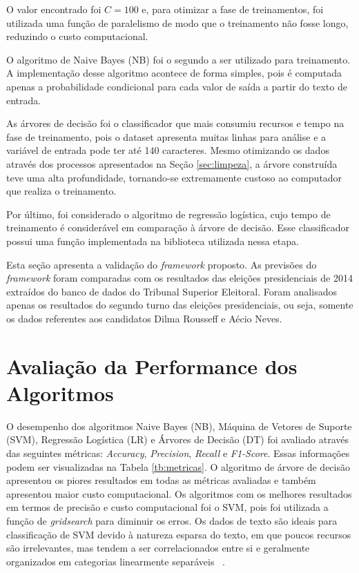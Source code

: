 O valor encontrado foi $C = 100$ e, para otimizar a fase de treinamentos, foi utilizada uma função de paralelismo de modo que o treinamento não fosse longo, reduzindo o custo computacional.

O algoritmo de Naive Bayes (NB) foi o segundo a ser utilizado para treinamento. A implementação desse algoritmo acontece de forma simples, pois é 
computada apenas a probabilidade condicional para cada valor de saída a partir do texto de entrada.


 As árvores de decisão foi o classificador que mais consumiu recursos e tempo na fase de treinamento, pois o dataset apresenta muitas linhas para análise
 e a variável de entrada pode ter até 140 caracteres. Mesmo otimizando os dados através dos processos apresentados na Seção \ref{sec:limpeza}, 
 a árvore construída teve uma alta profundidade, tornando-se extremamente custoso ao computador que realiza o treinamento.
 
Por último, foi considerado o algoritmo de regressão logística, cujo tempo de treinamento é considerável em comparação à árvore de decisão. Esse classificador possui uma função implementada na biblioteca utilizada nessa etapa.

Esta seção apresenta a validação do \textit{framework} proposto. As previsões do \textit{framework} foram comparadas com os 
resultados das eleições presidenciais de 2014 extraídos do banco
de dados do Tribunal Superior Eleitoral. Foram analisados apenas os resultados
do segundo turno das eleições presidenciais, ou seja, somente os dados referentes aos candidatos Dilma Rousseff e Aécio Neves.
 
 \section{Avaliação da Performance dos Algoritmos}
 
 O desempenho dos algoritmos Naive Bayes (NB), Máquina de
 Vetores de Suporte (SVM), Regressão Logística (LR) e Árvores de Decisão (DT)
 foi avaliado através das seguintes métricas: \textit{Accuracy}, \textit{Precision}, \textit{Recall} e \textit{F1-Score}. Essas informações podem ser visualizadas
 na Tabela \ref{tb:metricas}.
 O algoritmo de árvore de decisão apresentou os piores resultados em todas
 as métricas avaliadas e também apresentou maior custo
 computacional. Os algoritmos com os melhores resultados
 em termos de precisão e custo computacional foi o \acrshort{SVM}, pois foi utilizada a função de \textit{gridsearch} para
 diminuir os erros.
 Os dados de texto são ideais para classificação de SVM
 devido à natureza esparsa do texto, em que poucos recursos
 são irrelevantes, mas tendem a ser correlacionados entre si e
 geralmente organizados em categorias linearmente separáveis
 ~\cite{medhat}.
 
